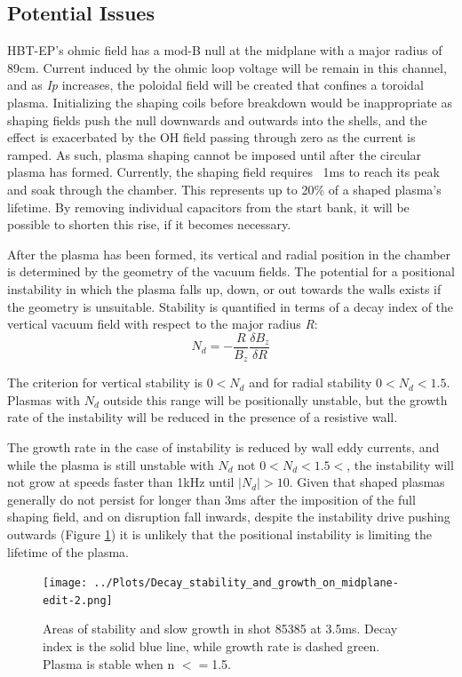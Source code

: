 \documentclass[aps,preprint,showpacs,superscriptaddress,groupedaddress]{revtex4}  %
\begin{document}
\subsection{Potential Issues}
	HBT-EP's ohmic field has a mod-B null at the midplane with a major radius of 89cm.  Current induced by the ohmic loop voltage will be remain in this channel, and as \textit{Ip} increases, the poloidal field will be created that confines a toroidal plasma.  Initializing the shaping coils before breakdown would be inappropriate as shaping fields push the null downwards and outwards into the shells, and the effect is exacerbated by the OH field passing through zero as the current is ramped.  As such, plasma shaping cannot be imposed until after the circular plasma has formed.  Currently, the shaping field requires ~1ms to reach its peak and soak through the chamber.  This represents up to 20\% of a shaped plasma's lifetime.  By removing individual capacitors from the start bank, it will be possible to shorten this rise, if it becomes necessary.\par
	After the plasma has been formed, its vertical and radial position in the chamber is determined by the geometry of the vacuum fields.  The potential for a positional instability in which the plasma falls up, down, or out towards the walls exists if the geometry is unsuitable.  Stability is quantified in terms of a decay index of the vertical vacuum field with respect to the major radius \textit{R}:$$N_d = -\frac{R}{B_z}\frac{\delta B_z}{\delta R}$$\par
	The criterion for vertical stability is $0 < N_d$ and for radial stability $0 < N_d < 1.5$.  Plasmas with $N_d$ outside this range will be positionally unstable, but the growth rate of the instability will be reduced in the presence of a resistive wall\cite{Fukuyama}.
	\par The growth rate in the case of instability is reduced by wall eddy currents, and while the plasma is still unstable with $N_d$ not $0<N_d<1.5<$, the instability will not grow at speeds faster than 1kHz until $|N_d| > 10$.  %
	Given that shaped plasmas generally do not persist for longer than 3ms after the imposition of the full shaping field, and on disruption fall inwards, despite the instability drive pushing outwards (Figure \ref{decay_index_and growth}) it is unlikely that the positional instability is limiting the lifetime of the plasma.

\begin{figure}[htb]
\centering
\texttt{[image: ../Plots/Decay\_stability\_and\_growth\_on\_midplane-edit-2.png]}
\caption{Areas of stability and slow growth in shot 85385 at 3.5ms. Decay index is the solid blue line, while growth rate is dashed green. Plasma is stable when n $<=$1.5.}
\label{decay_index_and growth}
\end{figure}
\end{document}
